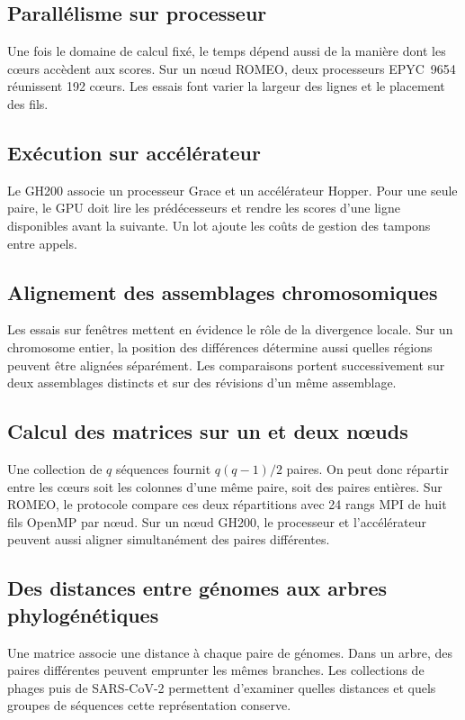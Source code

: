 \documentclass[10pt,a4paper]{article}
\begin{document}
\subsection{Parallélisme sur processeur}\label{sec:cpu}
Une fois le domaine de calcul fixé, le temps dépend aussi de la manière dont les cœurs accèdent aux scores. Sur un nœud ROMEO, deux processeurs EPYC~9654 réunissent 192 cœurs. Les essais font varier la largeur des lignes et le placement des fils.


\subsection{Exécution sur accélérateur}\label{sec:gpu}
Le GH200 associe un processeur Grace et un accélérateur Hopper. Pour une seule paire, le GPU doit lire les prédécesseurs et rendre les scores d'une ligne disponibles avant la suivante. Un lot ajoute les coûts de gestion des tampons entre appels.




\subsection{Alignement des assemblages chromosomiques}
Les essais sur fenêtres mettent en évidence le rôle de la divergence locale. Sur un chromosome entier, la position des différences détermine aussi quelles régions peuvent être alignées séparément. Les comparaisons portent successivement sur deux assemblages distincts et sur des révisions d’un même assemblage.

\subsection{Calcul des matrices sur un et deux nœuds}\label{sec:mpi}
Une collection de \(q\) séquences fournit \(q(q-1)/2\) paires. On peut donc répartir entre les cœurs soit les colonnes d’une même paire, soit des paires entières. Sur ROMEO, le protocole compare ces deux répartitions avec 24 rangs MPI de huit fils OpenMP par nœud.
Sur un nœud GH200, le processeur et l’accélérateur peuvent aussi aligner simultanément des paires différentes.








\subsection{Des distances entre génomes aux arbres phylogénétiques}\label{sec:bio}
Une matrice associe une distance à chaque paire de génomes. Dans un arbre, des paires différentes peuvent emprunter les mêmes branches. Les collections de phages puis de SARS-CoV-2 permettent d’examiner quelles distances et quels groupes de séquences cette représentation conserve.



\Needspace{.56\textheight}
\end{document}
